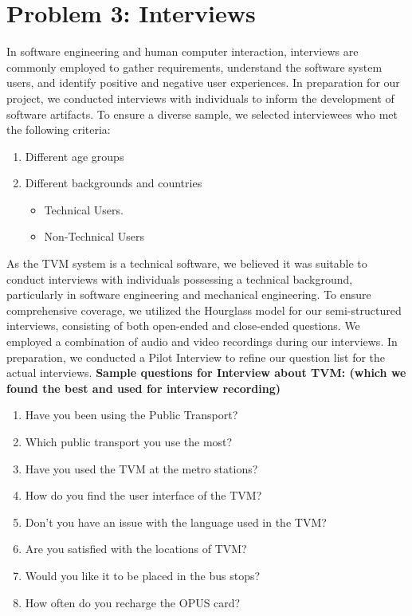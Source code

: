 \documentclass{article}
\begin{document}
{\section{Problem 3: Interviews}
In software engineering and human computer interaction, interviews are commonly employed to gather requirements, understand the software system users, and identify positive and negative user experiences. In preparation for our project, we conducted interviews with individuals to inform the development of software artifacts. To ensure a diverse sample, we selected interviewees who met the following criteria:
\begin{enumerate}
  \item Different age groups
  \item Different backgrounds and countries
  \begin{itemize}
  \item Technical Users.
  \item Non-Technical Users
\end{itemize}
\end{enumerate}
As the TVM system is a technical software, we believed it was suitable to conduct interviews with individuals possessing a technical background, particularly in software engineering and mechanical engineering. To ensure comprehensive coverage, we utilized the Hourglass model for our semi-structured interviews, consisting of both open-ended and close-ended questions. We employed a combination of audio and video recordings during our interviews. In preparation, we conducted a Pilot Interview to refine our question list for the actual interviews.
\newline
\newline
\textbf{Sample questions for Interview about TVM: (which we found the best and used for interview recording)}
\begin{enumerate}
\item Have you been using the Public Transport?
\item Which public transport you use the most?
\item Have you used the TVM at the metro stations?
\item How do you find the user interface of the TVM?
\item Don’t you have an issue with the language used in the TVM?
\item Are you satisfied with the locations of TVM?
\item Would you like it to be placed in the bus stops?
\item How often do you recharge the OPUS card?

\end{enumerate}}
\end{document}
